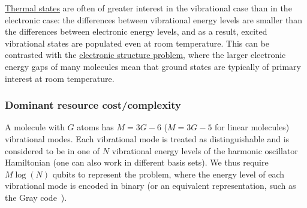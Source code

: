\begin{refsection}
\begin{itemize}
\end{itemize}
\hyperref[prim:GibbsSampling]{Thermal states} are often of greater interest in the vibrational case than in the electronic case: the differences between vibrational energy levels are smaller than the differences between electronic energy levels, and as a result, excited vibrational states are populated even at room temperature. This can be contrasted with the \hyperref[appl:ElectronicStructure]{electronic structure problem}, where the larger electronic energy gaps of many molecules mean that ground states are typically of primary interest at room temperature.



\subsubsection*{Dominant resource cost/complexity}
A molecule with $G$ atoms has $M= 3G - 6$ ($M=3G-5$ for linear molecules) vibrational modes. Each vibrational mode is treated as distinguishable and is considered to be in one of $N$ vibrational energy levels of the harmonic oscillator Hamiltonian (one can also work in different basis sets). We thus require $M\log(N)$ qubits to represent the problem, where the energy level of each vibrational mode is encoded in binary (or an equivalent representation, such as the Gray code~\cite{sawaya2020ResourceEfficientQuantumDLevel}).


\end{refsection}

